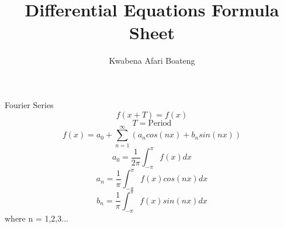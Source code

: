\documentclass[twocolumn]{article}
\title{Differential Equations Formula Sheet}
\author{Kwabena Afari Boateng}
\begin{document}
	Fourier Series
	$$f(x+T) = f(x)$$
	$$T = \text{Period}$$
	$$f(x)=a_0 + \sum^{\infty}_{n=1} (a_n cos(nx) + b_n sin(nx))$$
	$$a_0 = \frac{1}{2\pi} \int_{-\pi}^{\pi} f(x)dx$$
	$$a_n = \frac{1}{\pi} \int_{-\pi}^{\pi} f(x) cos(nx)dx$$
	$$b_n = \frac{1}{\pi} \int_{-\pi}^{\pi} f(x) sin(nx)dx$$
	where n = 1,2,3...
	
	\maketitle
	
\end{document}
